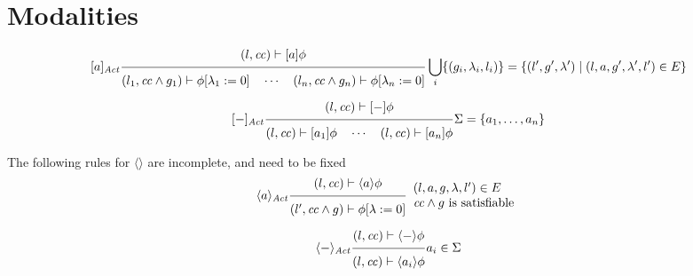 \documentclass{article}
\newcommand{\proofrule}[3][]{#1 \frac{\raisebox{.7ex}{\normalsize{$#2$}}}
  {\raisebox{-1.0ex}{\normalsize{$#3$}}}}
\newcommand{\loc}{l}
\newcommand{\region}{\mathit{cc}}
\begin{document}
\section{Modalities}

\[
\proofrule[{[a]_{\mathit{Act}}}]
{(\loc, \region) \vdash [a]\phi}
{(\loc_1, \region \land g_1) \vdash \phi{[\lambda_1 := 0]}
\quad \cdots \quad
(\loc_n, \region \land g_n) \vdash \phi{[\lambda_n := 0]}
}
\bigcup_i \{ (g_i,\lambda_i,\loc_i) \} = \{ (\loc', g', \lambda') \mid (\loc, a, g', \lambda', \loc') \in E \}
\]

\[
\proofrule[{[-]_{\mathit{Act}}}]
{(\loc, \region) \vdash [-]\phi}
{(\loc, \region) \vdash [a_1]\phi
\quad \cdots \quad
(\loc, \region) \vdash [a_n]\phi}
\Sigma = \{ a_1, \ldots, a_n \}
\]


The following rules for $\langle \rangle$ are incomplete, and need to be fixed
\[
\proofrule[\langle a \rangle_{\mathit{Act}}]
{(\loc, \region) \vdash \langle a \rangle \phi}
{(\loc', \region \land g) \vdash \phi[\lambda := 0]}
\begin{array}{l}
(\loc, a, g, \lambda, \loc') \in E\\
\region \land g \text{ is satisfiable}
\end{array}
\]

\[
\proofrule[\langle - \rangle_{\mathit{Act}}]
{(\loc, \region) \vdash \langle - \rangle \phi}
{(\loc, \region) \vdash \langle a_i \rangle \phi}
a_i \in \Sigma
\]



\end{document}
